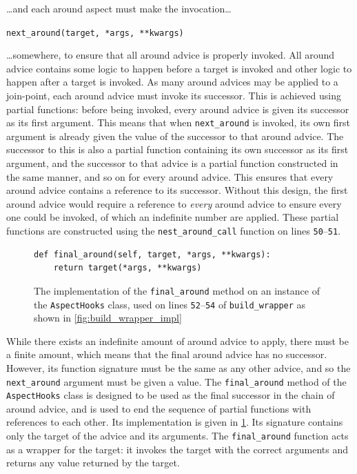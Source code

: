 \ldots{}and each around aspect must make the invocation\ldots{}

{\centering

\lstinline{next_around(target, *args, **kwargs)}

}

\ldots{}somewhere, to ensure that all around advice is properly invoked. All
around advice contains some logic to happen before a target is invoked and other
logic to happen after a target is invoked. As many around advices may be applied
to a join-point, each around advice must invoke its successor. This is achieved
using partial functions: before being invoked, every around advice is given its
successor as its first argument. This means that when \lstinline{next_around} is
invoked, its own first argument is already given the value of the successor to
that around advice. The successor to this is also a partial function containing
its own successor as its first argument, and the successor to that advice is a
partial function constructed in the same manner, and so on for every around
advice. This ensures that every around advice contains a reference to its
successor. Without this design, the first around advice would require a
reference to \emph{every} around advice to ensure every one could be invoked, of
which an indefinite number are applied. These partial functions are constructed
using the \lstinline{nest_around_call} function on lines
\texttt{50}--\texttt{51}.

\begin{figure}
    \begin{lstlisting}[style=footnotesize_python]
def final_around(self, target, *args, **kwargs):
    return target(*args, **kwargs)
    \end{lstlisting}
    \caption{The implementation of the \lstinline{final_around} method on an
    instance of the \lstinline{AspectHooks} class, used on lines
    \texttt{52}--\texttt{54} of \lstinline{build_wrapper} as shown in \cref{fig:build_wrapper_impl}}
    \label{fig:final_around_impl}
\end{figure}


While there exists an indefinite amount of around advice to apply, there must be
a finite amount, which means that the final around advice has no successor.
However, its function signature must be the same as any other advice, and so the
\lstinline{next_around} argument must be given a value. The
\lstinline{final_around} method of the \lstinline{AspectHooks} class is designed
to be used as the final successor in the chain of around advice, and is used to
end the sequence of partial functions with references to each other. Its
implementation is given in \cref{fig:final_around_impl}. Its
signature contains only the target of the advice and its arguments. The
\lstinline{final_around} function acts as a wrapper for the target: it invokes
the target with the correct arguments and returns any value returned by the
target. 

